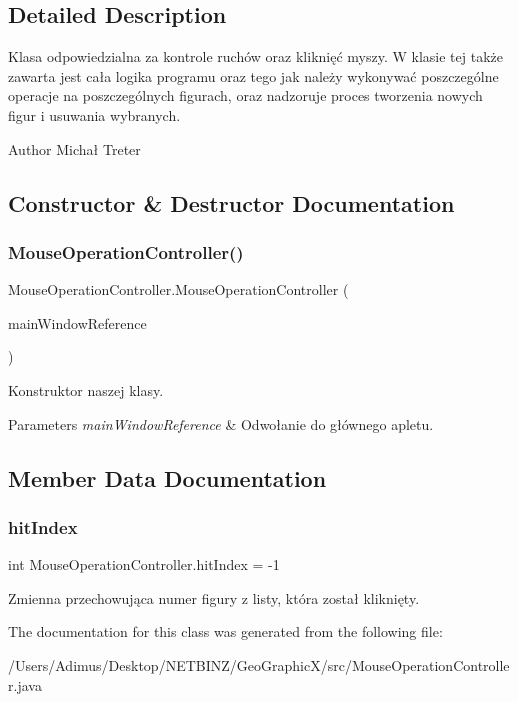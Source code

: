 \subsection{Detailed Description}
Klasa odpowiedzialna za kontrole ruchów oraz kliknięć myszy. W klasie tej także zawarta jest cała logika programu oraz tego jak należy wykonywać poszczególne operacje na poszczególnych figurach, oraz nadzoruje proces tworzenia nowych figur i usuwania wybranych. \begin{DoxyAuthor}{Author}
Michał Treter 
\end{DoxyAuthor}


\subsection{Constructor \& Destructor Documentation}
\mbox{\label{class_mouse_operation_controller_ae6f41a249d5256fd714c9a3a706d9f3b}} 
\subsubsection{Mouse\+Operation\+Controller()}
{\footnotesize\ttfamily Mouse\+Operation\+Controller.\+Mouse\+Operation\+Controller (\begin{DoxyParamCaption}\item[{\textbf{ Geo\+GraphicX}}]{main\+Window\+Reference }\end{DoxyParamCaption})}

Konstruktor naszej klasy. 
\begin{DoxyParams}{Parameters}
{\em main\+Window\+Reference} & Odwołanie do głównego apletu. \\
\hline
\end{DoxyParams}


\subsection{Member Data Documentation}
\mbox{\label{class_mouse_operation_controller_a2f1af5997db6cd521699d2eca5eea946}} 
\subsubsection{hit\+Index}
{\footnotesize\ttfamily int Mouse\+Operation\+Controller.\+hit\+Index = -\/1}

Zmienna przechowująca numer figury z listy, która został kliknięty. 

The documentation for this class was generated from the following file\+:\begin{DoxyCompactItemize}
\item 
/\+Users/\+Adimus/\+Desktop/\+N\+E\+T\+B\+I\+N\+Z/\+Geo\+Graphic\+X/src/Mouse\+Operation\+Controller.\+java\end{DoxyCompactItemize}
